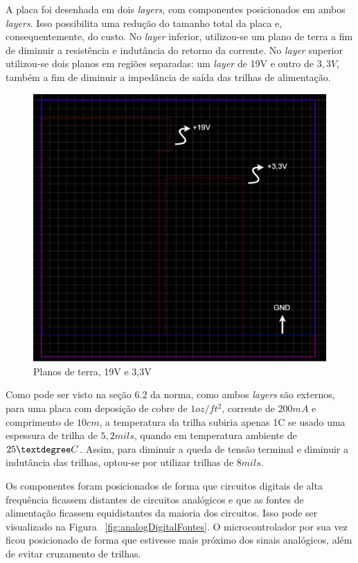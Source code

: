 \documentclass[
	12pt,				%
	openright,			%
	twoside,			%
	a4paper,			%
	english,			%
	french,				%
	spanish,			%
	brazil,				%
	]{abntex2}
\begin{document}
			A placa foi desenhada em dois \textit{layers}, com componentes
			posicionados em ambos \textit{layers}. Isso possibilita uma redução
			do tamanho total da placa e, consequentemente, do custo. No
			\textit{layer} inferior, utilizou-se um plano de terra a fim de
			diminuir a resistência e indutância do retorno da corrente.
			No \textit{layer} superior utilizou-se dois planos em regiões
			separadas: um \textit{layer} de 19V e outro de $3,3V$, também a fim de
			diminuir a impedância de saída das trilhas de alimentação.

			\begin{figure}[ht]
				\centering
				\includegraphics[scale=0.3]{../Fotos/pcbLayers.png}
				\caption{Planos de terra, 19V e 3,3V}
			\end{figure}

			Como pode ser visto na seção 6.2 da norma, como ambos \textit{layers} são
			externos, para uma placa com deposição de cobre de $1oz/ft^2$,
			corrente de $200mA$ e comprimento de $10cm$, a temperatura da
			trilha subiria apenas 1\textdegree C se usado uma espessura de
			trilha de $5,2 mils$, quando em temperatura ambiente de
			$25\textdegree C$. Assim, para diminuir a queda de tensão terminal e diminuir a indutância das trilhas, optou-se por utilizar trilhas de $8 mils$.

			Os componentes foram posicionados de forma que circuitos
			digitais de alta frequência ficassem distantes de circuitos
			analógicos e que as fontes de alimentação ficassem equidistantes
			da maioria dos circuitos. Isso pode ser visualizado na Figura
			~\ref{fig:analogDigitalFontes}. O microcontrolador por sua vez ficou posicionado de forma
			que estivesse mais próximo dos sinais analógicos, além de evitar
			cruzamento de trilhas.
\end{document}
